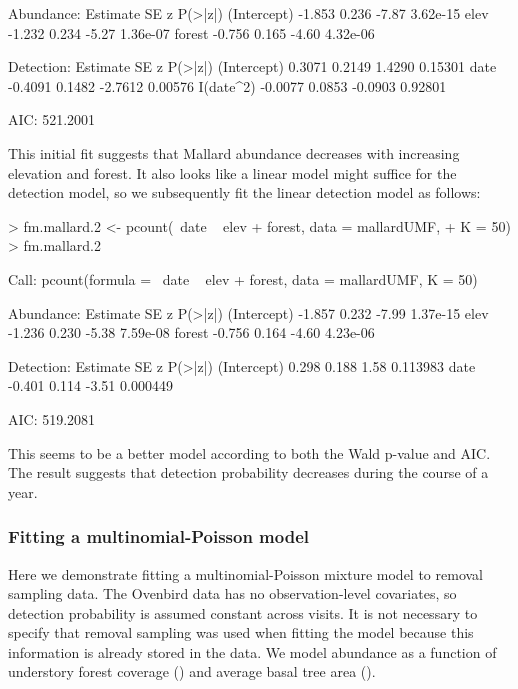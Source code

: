 \documentclass[article,shortnames]{jss}
\begin{document}
{\begin{Schunk}
\begin{Soutput}
Abundance:
            Estimate    SE     z  P(>|z|)
(Intercept)   -1.853 0.236 -7.87 3.62e-15
elev          -1.232 0.234 -5.27 1.36e-07
forest        -0.756 0.165 -4.60 4.32e-06

Detection:
            Estimate     SE       z P(>|z|)
(Intercept)   0.3071 0.2149  1.4290 0.15301
date         -0.4091 0.1482 -2.7612 0.00576
I(date^2)    -0.0077 0.0853 -0.0903 0.92801

AIC: 521.2001 
\end{Soutput}
\end{Schunk}

This initial fit suggests that Mallard abundance decreases with
increasing elevation and forest.  It also looks like a linear model
might suffice for the detection model, so we subsequently fit the
linear detection model as follows:


\begin{Schunk}
\begin{Sinput}
> fm.mallard.2 <- pcount(~date ~ elev + forest, data = mallardUMF, 
+     K = 50)
> fm.mallard.2
\end{Sinput}
\begin{Soutput}
Call:
pcount(formula = ~date ~ elev + forest, data = mallardUMF, K = 50)

Abundance:
            Estimate    SE     z  P(>|z|)
(Intercept)   -1.857 0.232 -7.99 1.37e-15
elev          -1.236 0.230 -5.38 7.59e-08
forest        -0.756 0.164 -4.60 4.23e-06

Detection:
            Estimate    SE     z  P(>|z|)
(Intercept)    0.298 0.188  1.58 0.113983
date          -0.401 0.114 -3.51 0.000449

AIC: 519.2081 
\end{Soutput}
\end{Schunk}

This seems to be a better model according to both the Wald p-value and
AIC.  The result suggests that detection probability decreases during the
course of a year.



\subsubsection{Fitting a multinomial-Poisson model}

Here we demonstrate fitting a multinomial-Poisson mixture model to removal
sampling data.  The Ovenbird data has no observation-level covariates, so
detection probability is assumed constant across visits.  It is not necessary
to specify that removal sampling was used when fitting the model
because this information is already stored in the  data.
We model abundance as a function of understory forest coverage ()
and average basal tree area ().

}
\end{document}
